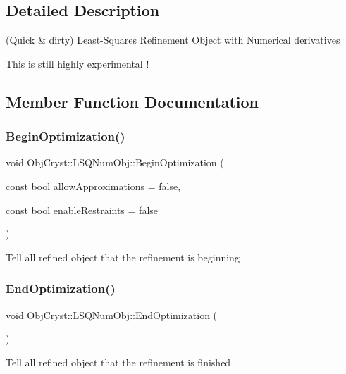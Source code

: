 \subsection{Detailed Description}
(Quick \& dirty) Least-\/\+Squares Refinement Object with Numerical derivatives 

This is still highly experimental ! 

\subsection{Member Function Documentation}
\mbox{\label{class_obj_cryst_1_1_l_s_q_num_obj_a6230c952ec8fc2c0ed63ac1b4de232a5}} 
\subsubsection{\texorpdfstring{BeginOptimization()}{BeginOptimization()}}
{\footnotesize\ttfamily void Obj\+Cryst\+::\+L\+S\+Q\+Num\+Obj\+::\+Begin\+Optimization (\begin{DoxyParamCaption}\item[{const bool}]{allow\+Approximations = {\ttfamily false},  }\item[{const bool}]{enable\+Restraints = {\ttfamily false} }\end{DoxyParamCaption})}

Tell all refined object that the refinement is beginning \mbox{\label{class_obj_cryst_1_1_l_s_q_num_obj_a4c6168e319fd4a8f949997d1b54012ba}} 
\subsubsection{\texorpdfstring{EndOptimization()}{EndOptimization()}}
{\footnotesize\ttfamily void Obj\+Cryst\+::\+L\+S\+Q\+Num\+Obj\+::\+End\+Optimization (\begin{DoxyParamCaption}{ }\end{DoxyParamCaption})}

Tell all refined object that the refinement is finished \mbox{\label{class_obj_cryst_1_1_l_s_q_num_obj_ac3f32c7adf83c788c43c16c07ad00630}} 
